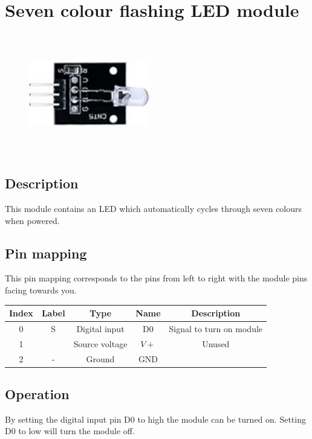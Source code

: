 \section{Seven colour flashing LED module}
\begin{figure}[H]
    \centering
    \includegraphics[angle=0, keepaspectratio=true, scale=1, width=200px, height=200px]{images/7_led.jpg}
\end{figure}
\subsection*{Description}
This module contains an LED which automatically cycles through seven colours when powered.
\subsection*{Pin mapping}
This pin mapping corresponds to the pins from left to right with the module pins facing towards you.
\begin{table}[H]
    \centering
    \begin{tabular}{|c|c|c|c|c|}
    \hline
    Index &Label &Type &Name &Description\\ \hline
    0 &S &Digital input &D0 &Signal to turn on module\\ \hline
    1 & &Source voltage &$V+$ &Unused\\ \hline
    2 &- &Ground &GND &\\ \hline
    \end{tabular}
\end{table}
\subsection*{Operation}
By setting the digital input pin D0 to high the module can be turned on. Setting D0 to low will turn the module off.
%